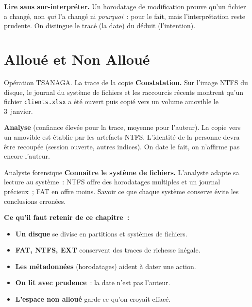 \begin{boxCRO}
\textbf{Lire sans sur-interpréter.} Un horodatage de modification prouve
qu'un fichier a changé, non \emph{qui} l'a changé ni \emph{pourquoi}~:
 pour le fait, mais l'interprétation reste prudente. On
distingue le tracé (la date) du déduit (l'intention).
\end{boxCRO}

\section{Alloué et Non Alloué}
\label{sec:c10-alloue}

\begin{boxscenario}{Opération TSANAGA. La trace de la copie}
\textbf{Constatation.} Sur l'image NTFS du disque, le journal du système de
fichiers et les raccourcis récents montrent qu'un fichier
\texttt{clients.xlsx} a été ouvert puis copié vers un volume amovible le
3~janvier.

\medskip
\textbf{Analyse} (confiance élevée pour la trace, moyenne pour l'auteur). La
copie vers un amovible est établie par les artefacts NTFS. L'identité de la
personne devra être recoupée (session ouverte, autres indices). On date le
fait, on n'affirme pas encore l'auteur.
\end{boxscenario}

\begin{boxmetier}{Analyste forensique}
\textbf{Connaître le système de fichiers.} L'analyste adapte sa lecture au
système~: NTFS offre des horodatages multiples et un journal précieux~; FAT
en offre moins. Savoir ce que chaque système conserve évite les conclusions
erronées.
\end{boxmetier}

\separateur

\begin{boxresume}
\textbf{Ce qu'il faut retenir de ce chapitre~:}
\begin{itemize}
    \item \textbf{Un disque} se divise en partitions et systèmes de fichiers.
    \item \textbf{FAT, NTFS, EXT} conservent des traces de richesse inégale.
    \item \textbf{Les métadonnées} (horodatages) aident à dater une action.
    \item \textbf{On lit avec prudence}~: la date n'est pas l'auteur.
    \item \textbf{L'espace non alloué} garde ce qu'on croyait effacé.
\end{itemize}
\end{boxresume}

